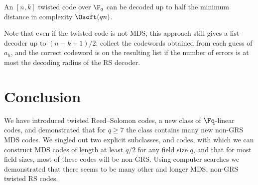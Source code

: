 \documentclass[conference,a4paper]{IEEEtran}
\begin{document}
\begin{theorem}
  An $[n,k]$ twisted code over $\F_q$ can be decoded up to half the minimum distance in complexity $\Osoft(qn)$.
\end{theorem}

Note that even if the twisted code is not MDS, this approach still gives a list-decoder up to $(n-k+1)/2$: collect the codewords obtained from each guess of $a_h$, and the correct codeword is on the resulting list if the number of errors is at most the decoding radius of the RS decoder.



\section{Conclusion}

We have introduced twisted Reed--Solomon codes, a new class of $\Fq$-linear codes, and demonstrated that for $q \ge 7$ the class contains many new non-GRS MDS codes.
We singled out two explicit subclasses, \startw and \plustw codes, with which we can construct MDS codes of length at least $q/2$ for any field size $q$, and that for most field sizes, most of these codes will be non-GRS.
Using computer searches we demonstrated that there seems to be many other and longer MDS, non-GRS twisted RS codes.




\end{document}
